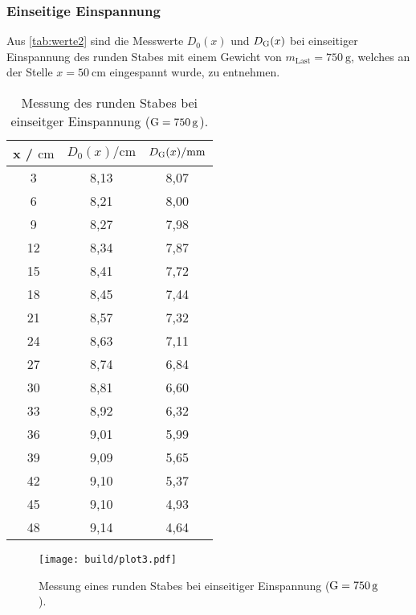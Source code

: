 \subsubsection{Einseitige Einspannung}
\label{subsubsec:rundEinsEing}

Aus \autoref{tab:werte2} sind die Messwerte $D_0(x)$ und $D_{\text G}(x)$ bei einseitiger Einspannung des runden Stabes mit
einem Gewicht von $m_{\text{Last}} = \SI{750}{\gram}$, welches an der Stelle $x= \SI{50}{\cm}$ eingespannt wurde, zu entnehmen.


\sloppy
\begin{table}[H]
  \centering
  \caption{Messung des runden Stabes bei einseitger Einspannung ($\text G = \SI{750}{\gram}$).}
  \label{tab:werte2}
  \begin{tabular}{c c c}
    \toprule
    x / $\si{\centi\meter} $ & $ D_0(x) / \si{\centi\meter}$ & $D_{\text G}(x) / \si{\milli\meter}$ \\
    \midrule
    3 & 8,13 & 8,07 \\
    6 & 8,21 & 8,00 \\
    9 & 8,27 & 7,98 \\
    12 & 8,34 & 7,87 \\
    15 & 8,41 & 7,72 \\
    18 & 8,45 & 7,44 \\
    21 & 8,57 & 7,32 \\
    24 & 8,63 & 7,11 \\
    27 & 8,74 & 6,84 \\
    30 & 8,81 & 6,60 \\
    33 & 8,92 & 6,32 \\
    36 & 9,01 & 5,99 \\
    39 & 9,09 & 5,65 \\
    42 & 9,10 & 5,37 \\
    45 & 9,10 & 4,93 \\
    48 & 9,14 & 4,64 \\
    \bottomrule
  \end{tabular}
\end{table}

\sloppy
\begin{figure}
  \centering
  \texttt{[image: build/plot3.pdf]}
  \caption{Messung eines runden Stabes bei einseitiger Einspannung ($\text G = \SI{750}{\gram}$).}
  \label{fig:plot3}
\end{figure}

